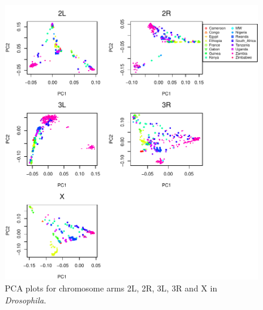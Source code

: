 \documentclass[11pt, oneside]{article}   	%
\begin{document}
\begin{figure}
    \begin{center}
       \includegraphics[width=1\textwidth]{FigS_pca_plots_allchr_drosophila}
    \end{center}
    \caption{
        PCA plots for chromosome arms 2L, 2R, 3L, 3R and X in \textit{Drosophila}.
        \label{fig:pca_drosophila_allchr}
    }
\end{figure}
\end{document}
